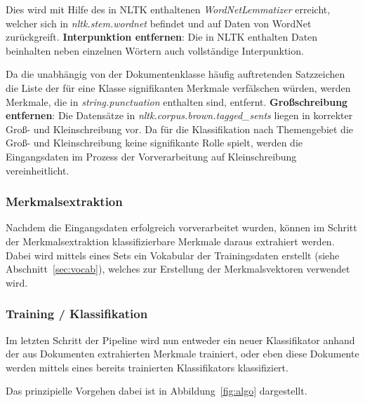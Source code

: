             Dies wird mit Hilfe des in NLTK enthaltenen \textit{WordNetLemmatizer} erreicht, welcher sich in \textit{nltk.stem.wordnet} befindet und auf Daten von WordNet zurückgreift.\newline\newline
            \textbf{Interpunktion entfernen}:\newline
            Die in NLTK enthalten Daten beinhalten neben einzelnen Wörtern auch vollständige Interpunktion. 

            Da die unabhängig von der Dokumentenklasse häufig auftretenden Satzzeichen die Liste der für eine Klasse signifikanten Merkmale verfälschen würden, werden Merkmale, die in \textit{string.punctuation} enthalten sind, entfernt.\newline\newline
            \textbf{Großschreibung entfernen}:\newline
            Die Datensätze in \textit{nltk.corpus.brown.tagged\_sents} liegen in korrekter Groß- und Kleinschreibung vor. 
            Da für die Klassifikation nach Themengebiet die Groß- und Kleinschreibung keine signifikante Rolle spielt, werden die Eingangsdaten im Prozess der Vorverarbeitung auf Kleinschreibung vereinheitlicht.

        \subsubsection{Merkmalsextraktion}
                Nachdem die Eingangsdaten erfolgreich vorverarbeitet wurden, können im Schritt der Merkmalsextraktion klassifizierbare Merkmale daraus extrahiert werden. 
                Dabei wird mittels eines Sets ein Vokabular der Trainingsdaten erstellt (siehe Abschnitt~\ref{sec:vocab}), welches zur Erstellung der Merkmalsvektoren verwendet wird.

        \subsubsection{Training / Klassifikation}
                Im letzten Schritt der Pipeline wird nun entweder ein neuer Klassifikator anhand der aus Dokumenten extrahierten Merkmale trainiert, oder eben diese Dokumente werden mittels eines bereits trainierten Klassifikators klassifiziert. 
                
                Das prinzipielle Vorgehen dabei ist in Abbildung~\ref{fig:algo} dargestellt.

